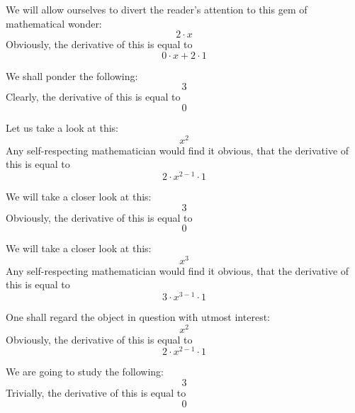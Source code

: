 \documentclass{article}
\begin{document}
We will allow ourselves to divert the reader's attention to this gem of mathematical wonder:
\begin{equation}
2 \cdot x 
\end{equation}
Obviously, the derivative of this is equal to
\begin{equation}
0 \cdot x + 2 \cdot 1 
\end{equation}

We shall ponder the following:
\begin{equation}
3 
\end{equation}
Clearly, the derivative of this is equal to
\begin{equation}
0 
\end{equation}

Let us take a look at this:
\begin{equation}
x ^{2 } 
\end{equation}
Any self-respecting mathematician would find it obvious, that the derivative of this is equal to
\begin{equation}
2 \cdot x ^{2 - 1 } \cdot 1 
\end{equation}

We will take a closer look at this:
\begin{equation}
3 
\end{equation}
Obviously, the derivative of this is equal to
\begin{equation}
0 
\end{equation}

We will take a closer look at this:
\begin{equation}
x ^{3 } 
\end{equation}
Any self-respecting mathematician would find it obvious, that the derivative of this is equal to
\begin{equation}
3 \cdot x ^{3 - 1 } \cdot 1 
\end{equation}

One shall regard the object in question with utmost interest:
\begin{equation}
x ^{2 } 
\end{equation}
Obviously, the derivative of this is equal to
\begin{equation}
2 \cdot x ^{2 - 1 } \cdot 1 
\end{equation}

We are going to study the following:
\begin{equation}
3 
\end{equation}
Trivially, the derivative of this is equal to
\begin{equation}
0 
\end{equation}
\end{document}
